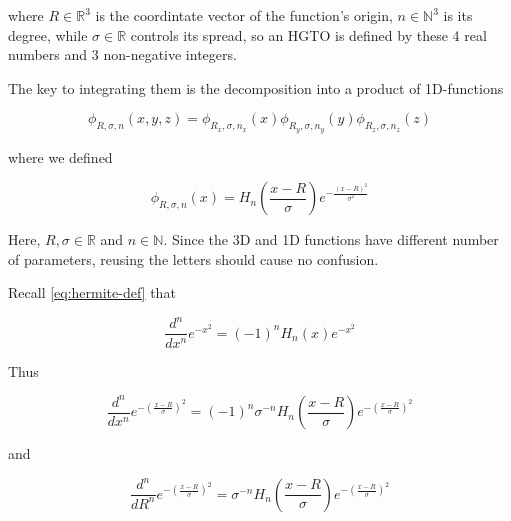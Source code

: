\documentclass{article}
\begin{document}
\begin{appendices}
where \begin{math}R \in \mathbb{R}^3\end{math} is the coordintate vector of the function's origin, \begin{math}n\in\mathbb{N}^3\end{math} is its degree, while \begin{math}\sigma \in \mathbb{R}\end{math} controls its spread, so an HGTO is defined by these 4 real numbers and 3 non-negative integers.

The key to integrating them is the decomposition into a product of 1D-functions

\begin{equation} \label{eq:hgto-decomposition-1d}
\phi_{R,\sigma,n}(x,y,z) = \phi_{R_x,\sigma,n_x}(x)\phi_{R_y,\sigma,n_y}(y)\phi_{R_z,\sigma,n_z}(z)
\end{equation}

where we defined

\begin{equation}
\phi_{R,\sigma,n}(x) = H_n\left(\frac{x-R}{\sigma}\right) e^{-\frac{(x-R)^2}{\sigma^2}}
\end{equation}

Here, \begin{math}R,\sigma \in \mathbb{R}\end{math} and \begin{math}n \in \mathbb{N}\end{math}. Since the 3D and 1D functions have different number of parameters, reusing the letters should cause no confusion.

Recall \eqref{eq:hermite-def} that

\begin{equation}
\frac{d^n}{dx^n}e^{-x^2} = (-1)^n H_n(x) e^{-x^2}
\end{equation}

Thus

\begin{equation} \label{eq:gaussian-der-hermite-1}
\frac{d^n}{dx^n}e^{-\left(\frac{x-R}{\sigma}\right)^2} = (-1)^n \sigma^{-n} H_n \left(\frac{x-R}{\sigma}\right) e^{-\left(\frac{x-R}{\sigma}\right)^2}
\end{equation}

and

\begin{equation} \label{eq:gaussian-der-hermite-2}
\frac{d^n}{dR^n}e^{-\left(\frac{x-R}{\sigma}\right)^2} = \sigma^{-n} H_n \left(\frac{x-R}{\sigma}\right) e^{-\left(\frac{x-R}{\sigma}\right)^2}
\end{equation}


\end{appendices}
\end{document}
